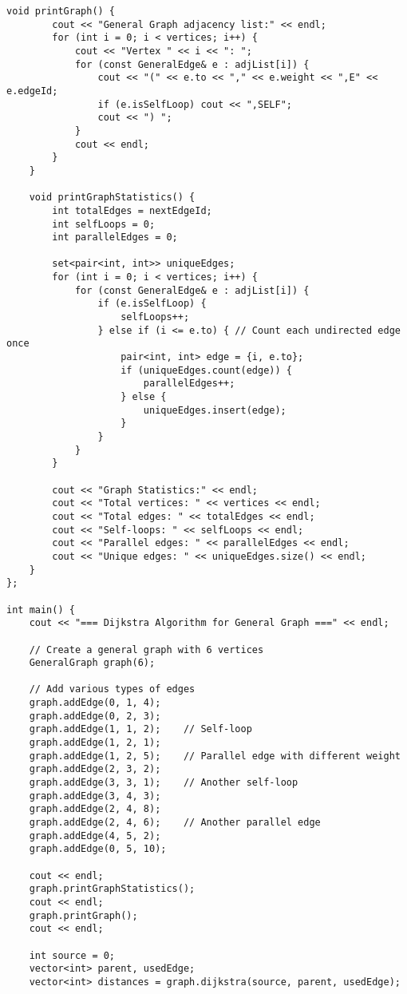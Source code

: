 \documentclass[12pt,a4paper]{article}
\begin{document}
\begin{lstlisting}[caption={Thuật toán Dijkstra cho đồ thị tổng quát}]
    void printGraph() {
        cout << "General Graph adjacency list:" << endl;
        for (int i = 0; i < vertices; i++) {
            cout << "Vertex " << i << ": ";
            for (const GeneralEdge& e : adjList[i]) {
                cout << "(" << e.to << "," << e.weight << ",E" << e.edgeId;
                if (e.isSelfLoop) cout << ",SELF";
                cout << ") ";
            }
            cout << endl;
        }
    }
    
    void printGraphStatistics() {
        int totalEdges = nextEdgeId;
        int selfLoops = 0;
        int parallelEdges = 0;
        
        set<pair<int, int>> uniqueEdges;
        for (int i = 0; i < vertices; i++) {
            for (const GeneralEdge& e : adjList[i]) {
                if (e.isSelfLoop) {
                    selfLoops++;
                } else if (i <= e.to) { // Count each undirected edge once
                    pair<int, int> edge = {i, e.to};
                    if (uniqueEdges.count(edge)) {
                        parallelEdges++;
                    } else {
                        uniqueEdges.insert(edge);
                    }
                }
            }
        }
        
        cout << "Graph Statistics:" << endl;
        cout << "Total vertices: " << vertices << endl;
        cout << "Total edges: " << totalEdges << endl;
        cout << "Self-loops: " << selfLoops << endl;
        cout << "Parallel edges: " << parallelEdges << endl;
        cout << "Unique edges: " << uniqueEdges.size() << endl;
    }
};

int main() {
    cout << "=== Dijkstra Algorithm for General Graph ===" << endl;
    
    // Create a general graph with 6 vertices
    GeneralGraph graph(6);
    
    // Add various types of edges
    graph.addEdge(0, 1, 4);
    graph.addEdge(0, 2, 3);
    graph.addEdge(1, 1, 2);    // Self-loop
    graph.addEdge(1, 2, 1);
    graph.addEdge(1, 2, 5);    // Parallel edge with different weight
    graph.addEdge(2, 3, 2);
    graph.addEdge(3, 3, 1);    // Another self-loop
    graph.addEdge(3, 4, 3);
    graph.addEdge(2, 4, 8);
    graph.addEdge(2, 4, 6);    // Another parallel edge
    graph.addEdge(4, 5, 2);
    graph.addEdge(0, 5, 10);
    
    cout << endl;
    graph.printGraphStatistics();
    cout << endl;
    graph.printGraph();
    cout << endl;
    
    int source = 0;
    vector<int> parent, usedEdge;
    vector<int> distances = graph.dijkstra(source, parent, usedEdge);
    

\end{lstlisting}
\end{document}
